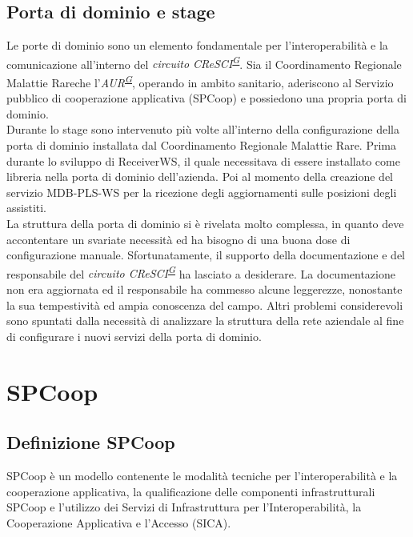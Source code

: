 \documentclass[a4paper]{article}
\newcommand{\crmr}{Coordinamento Regionale Malattie Rare}
\begin{document}
\subsection{Porta di dominio e stage}
Le porte di dominio sono un elemento fondamentale per l'interoperabilità e la comunicazione all'interno del \textit{circuito CReSCI\textsuperscript{\hyperref[sec:gl]{G}}}. Sia il \crmr che l'\textit{AUR\textsuperscript{\hyperref[sec:gl]{G}}}, operando in ambito sanitario, aderiscono al Servizio pubblico di cooperazione applicativa (SPCoop) e possiedono una propria porta di dominio.
\\
Durante lo stage sono intervenuto più volte all'interno della configurazione della porta di dominio installata dal \crmr. Prima durante lo sviluppo di ReceiverWS, il quale necessitava di essere installato come libreria nella porta di dominio dell'azienda. Poi al momento della creazione del servizio MDB-PLS-WS per la ricezione degli aggiornamenti sulle posizioni degli assistiti.
\\
La struttura della porta di dominio si è rivelata molto complessa, in quanto deve accontentare un svariate necessità ed ha bisogno di una buona dose di configurazione manuale. Sfortunatamente, il supporto della documentazione e del responsabile del \textit{circuito CReSCI\textsuperscript{\hyperref[sec:gl]{G}}} ha lasciato a desiderare. La documentazione non era aggiornata ed il responsabile ha commesso alcune leggerezze, nonostante la sua tempestività ed ampia conoscenza del campo. Altri problemi considerevoli sono spuntati dalla necessità di analizzare la struttura della rete aziendale al fine di configurare i nuovi servizi della porta di dominio.

\newpage

\section{SPCoop}

\subsection{Definizione SPCoop}
SPCoop è un modello contenente le modalità tecniche per l’interoperabilità e la cooperazione applicativa, la qualificazione delle componenti infrastrutturali SPCoop e l’utilizzo dei Servizi di Infrastruttura per l’Interoperabilità, la Cooperazione Applicativa e l’Accesso (SICA).
\end{document}
